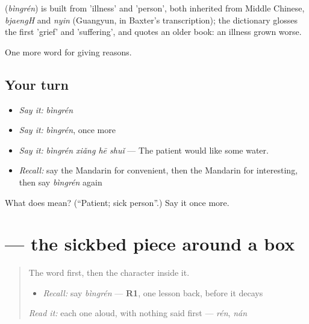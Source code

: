 \begin{cousinweb}
\textbf{} (\emph{bìngrén}) is built from  'illness' and  'person', both inherited from Middle Chinese, \emph{bjaengH} and \emph{nyin} (Guangyun, in Baxter's transcription); the dictionary glosses the first 'grief' and 'suffering', and quotes an older book: an illness grown worse.
\end{cousinweb}

\begin{grammarlens}[title={What you've built}]
One more word for giving reasons.
\end{grammarlens}

\subsection*{Your turn}
\begin{itemize}
\raggedright
  \item \emph{Say it:} \emph{bìngrén}
  \item \emph{Say it:} \emph{bìngrén}, once more
  \item \emph{Say it:} \emph{bìngrén xiǎng hē shuǐ} — The patient would like some water.
  \item \emph{Recall:} say the Mandarin for convenient, then the Mandarin for interesting, then say \emph{bìngrén} again
\end{itemize}

\begin{tcolorbox}[breakable,colback=teal!4,colframe=teal!35!black,title={Before you move on}]
What does  mean? (\textquotedblleft{}Patient; sick person\textquotedblright{}.) Say it once more.
\end{tcolorbox}
\section[\texorpdfstring{\zh{病} (bìng)}{病 (bìng)}]{ — the sickbed piece around a box}

\label{lesson:ZH-W130-bing-ill}



\begin{quote}
The word first, then the character inside it.

\begin{itemize}
\raggedright
  \item \emph{Recall:} say \emph{bìngrén} — \textbf{R1}, one lesson back, before it decays
\end{itemize}

\begin{quote}
 
\end{quote}

\emph{Read it:} each one aloud, with nothing said first — \emph{rén}, \emph{nán}
\end{quote}

